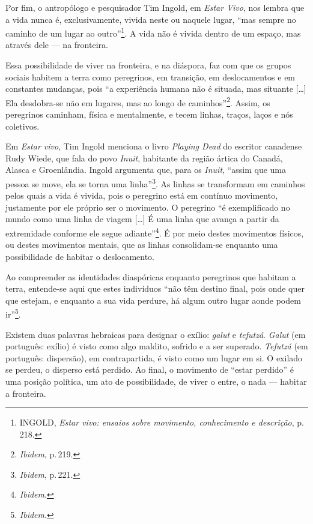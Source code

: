 Por fim, o antropólogo e pesquisador Tim Ingold, em \emph{Estar Vivo},
nos lembra que a vida nunca é, exclusivamente, vivida neste ou naquele
lugar, ``mas sempre no caminho de um lugar ao outro''\footnote{INGOLD,
  \emph{Estar vivo: ensaios sobre movimento, conhecimento e descrição},
  p.\,218.}. A vida não é vivida dentro de um espaço, mas através dele
--- na fronteira.

Essa possibilidade de viver na fronteira, e na diáspora, faz com que os
grupos sociais habitem a terra como peregrinos, em transição, em
deslocamentos e em constantes mudanças, pois ``a experiência humana
não é situada, mas situante {[}\ldots{}{]} Ela desdobra-se não em lugares,
mas ao longo de caminhos''\footnote{\emph{Ibidem}, p.\,219.}. Assim, os
peregrinos caminham, física e mentalmente, e tecem linhas, traços, laços
e nós coletivos.

Em \emph{Estar vivo}, Tim Ingold menciona o livro \emph{Playing Dead} do
escritor canadense Rudy Wiede, que fala do povo \emph{Inuit}, habitante
da região ártica do Canadá, Alasca e Groenlândia. Ingold argumenta que,
para os \emph{Inuit}, ``assim que uma pessoa se move, ela se torna
uma linha''\footnote{\emph{Ibidem}, p.\,221.}. As linhas se transformam em
caminhos pelos quais a vida é vivida, pois o peregrino está em contínuo movimento,
justamente por ele próprio ser o movimento. O peregrino ``é
exemplificado no mundo como uma linha de viagem {[}\ldots{}{]} É uma linha
que avança a partir da extremidade conforme ele segue
adiante''\footnote{\emph{Ibidem}.}. É por meio destes movimentos físicos, ou
destes movimentos mentais, que as linhas consolidam-se enquanto uma
possibilidade de habitar o deslocamento.


Ao compreender as identidades diaspóricas enquanto peregrinos que
habitam a terra, entende-se aqui que estes indivíduos ``não têm
destino final, pois onde quer que estejam, e enquanto a sua vida
perdure, há algum outro lugar aonde podem ir''\footnote{\emph{Ibidem}.}.

Existem duas palavras hebraicas para designar o exílio: \emph{galut} e
\emph{tefutzá}. \emph{Galut} (em português: exílio) é visto como algo
maldito, sofrido e a ser superado. \emph{Tefutzá} (em português:
dispersão), em contrapartida, é visto como um lugar em si. O exilado se
perdeu, o disperso está perdido. Ao final, o movimento de ``estar
perdido'' é uma posição política, um ato de possibilidade, de viver o
entre, o nada --- habitar a fronteira.

